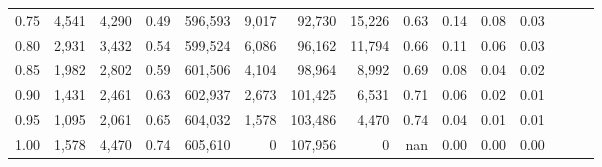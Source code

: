 \begin{tabular}{rrrrrrrrrrrrrrr}
0.75 &   4,541 &  4,290 &  0.49 &  596,593 &    9,017 &   92,730 &   15,226 &  0.63 &  0.14 &  0.08 &      0.03 \\
0.80 &   2,931 &  3,432 &  0.54 &  599,524 &    6,086 &   96,162 &   11,794 &  0.66 &  0.11 &  0.06 &      0.03 \\
0.85 &   1,982 &  2,802 &  0.59 &  601,506 &    4,104 &   98,964 &    8,992 &  0.69 &  0.08 &  0.04 &      0.02 \\
0.90 &   1,431 &  2,461 &  0.63 &  602,937 &    2,673 &  101,425 &    6,531 &  0.71 &  0.06 &  0.02 &      0.01 \\
0.95 &   1,095 &  2,061 &  0.65 &  604,032 &    1,578 &  103,486 &    4,470 &  0.74 &  0.04 &  0.01 &      0.01 \\
1.00 &   1,578 &  4,470 &  0.74 &  605,610 &        0 &  107,956 &        0 &   nan &  0.00 &  0.00 &      0.00 \\
\bottomrule
\end{tabular}
